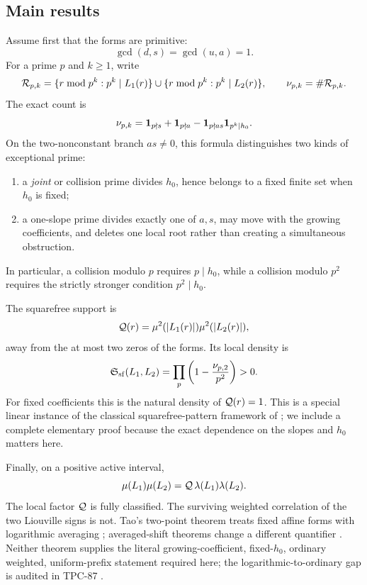 \subsection{Main results}

Assume first that the forms are primitive:
\[
 \gcd(d,s)=\gcd(u,a)=1.
\]
For a prime \(p\) and \(k\ge1\), write
\[
 \mathcal R_{p,k}
 =
 \{r\bmod p^k:p^k\mid L_1(r)\}
 \cup
 \{r\bmod p^k:p^k\mid L_2(r)\},
 \qquad
 \nu_{p,k}=\#\mathcal R_{p,k}.
\]
The exact count is
\begin{equation}
 \nu_{p,k}
 =
 \mathbf 1_{p\nmid s}+\mathbf 1_{p\nmid a}
 -\mathbf 1_{p\nmid as}\mathbf 1_{p^k\mid h_0}.
\label{eq:intro-root-count}
\end{equation}
On the two-nonconstant branch \(as\ne0\), this formula distinguishes
two kinds of exceptional prime:
\begin{enumerate}[label=(\roman*),leftmargin=2.2em]
\item a \emph{joint} or collision prime divides \(h_0\), hence belongs
to a fixed finite set when \(h_0\) is fixed;
\item a one-slope prime divides exactly one of \(a,s\), may move with
the growing coefficients, and deletes one local root rather than
creating a simultaneous obstruction.
\end{enumerate}
In particular, a collision modulo \(p\) requires \(p\mid h_0\), while
a collision modulo \(p^2\) requires the strictly stronger condition
\(p^2\mid h_0\).

The squarefree support is
\[
 \mathcal Q(r)=\mu^2(|L_1(r)|)\mu^2(|L_2(r)|),
\]
away from the at most two zeros of the forms.  Its local density is
\[
 \mathfrak S_{\mathrm{sf}}(L_1,L_2)
 =
 \prod_p\left(1-\frac{\nu_{p,2}}{p^2}\right)>0.
\]
For fixed coefficients this is the natural density of
\(\mathcal Q(r)=1\).  This is a special linear instance of the classical
squarefree-pattern framework of \citet{Mirsky1949}; we include a
complete elementary proof because the exact dependence on the
slopes and \(h_0\) matters here.

Finally, on a positive active interval,
\[
 \mu(L_1)\mu(L_2)
 =
 \mathcal Q\,\lambda(L_1)\lambda(L_2).
\]
The local factor \(\mathcal Q\) is fully classified.  The surviving
weighted correlation of the two Liouville signs is not.  Tao's
two-point theorem treats fixed affine forms with logarithmic
averaging \citep{Tao2016}; averaged-shift theorems change a different
quantifier \citep{MatomakiRadziwillTao2015}.  Neither theorem supplies
the literal growing-coefficient, fixed-\(h_0\), ordinary weighted,
uniform-prefix statement required here; the logarithmic-to-ordinary
gap is audited in TPC-87 \citep{WangTPC87}.

